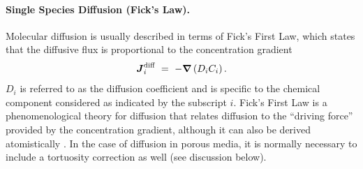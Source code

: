 \paragraph{Single Species Diffusion (Fick's Law).}

Molecular diffusion is usually described in terms of Fick's First Law, which states that the diffusive flux is proportional to the concentration gradient
\begin{equation} \label{eq:FicksFirstLaw} 
\boldsymbol{J}_{i}^\text{diff} \ =\  -\boldsymbol{\nabla} \left( D_{i} C_{i} \right).  
\end{equation} 
$D_i$ is referred to as the diffusion coefficient and is specific to the chemical component considered as indicated by the subscript $i$.  Fick's First Law is a phenomenological theory for diffusion that relates diffusion to the ``driving force'' provided by the concentration gradient, although it can also be derived atomistically \citep{lasaga1998kinetic}.   In the case of diffusion in porous media, it is normally necessary to include a tortuosity correction as well (see discussion below).  

